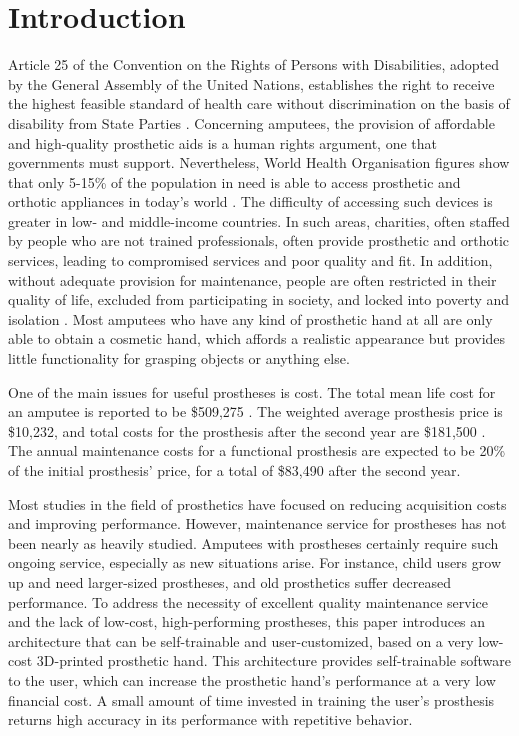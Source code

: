 \chapter{Introduction}

Article 25 of the Convention on the Rights of Persons
with Disabilities, adopted by the General Assembly of the United
Nations, establishes the right to receive the highest feasible
standard of health care without discrimination on the basis of
disability from State Parties \cite{UN}. Concerning amputees, the
provision of affordable and high-quality prosthetic aids is a human
rights argument, one that governments must support. Nevertheless,
World Health Organisation figures show that only 5-15\% of the
population in need is able to access prosthetic and orthotic
appliances in today's world \cite{WHO}. The difficulty of accessing
such devices is greater in low- and middle-income countries. In such
areas, charities, often staffed by people who are not trained
professionals, often provide prosthetic and orthotic services, leading
to compromised services and poor quality and fit. In addition, without
adequate provision for maintenance, people are often restricted in
their quality of life, excluded from participating in society, and
locked into poverty and isolation \cite{WHO}. Most amputees who have
any kind of prosthetic hand at all are only able to obtain a cosmetic
hand, which affords a realistic appearance \cite{3D4} but provides
little functionality for grasping objects or anything else.

One of the main issues for useful prostheses is cost. The total mean
life cost for an amputee is reported to be \$509,275
\cite{cost_1}. The weighted average prosthesis price is \$10,232, and
total costs for the prosthesis after the second year are \$181,500
\cite{cost}. The annual maintenance costs for a functional prosthesis
are expected to be 20\% of the initial prosthesis' price, for a total
of \$83,490 after the second year.

Most studies in the field of prosthetics have focused on reducing
acquisition costs and improving performance.  However, maintenance
service for prostheses has not been nearly as heavily studied.
Amputees with prostheses certainly require such ongoing service,
especially as new situations arise.  For instance, child users grow up
and need larger-sized prostheses, and old prosthetics suffer decreased
performance.  To address the necessity of excellent quality
maintenance service and the lack of low-cost, high-performing
prostheses, this paper introduces an architecture that can be
self-trainable and user-customized, based on a very low-cost
3D-printed prosthetic hand. This architecture provides self-trainable
software to the user, which can increase the prosthetic hand's
performance at a very low financial cost. A small amount of time
invested in training the user's prosthesis returns high accuracy in
its performance with repetitive behavior.
